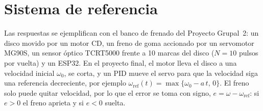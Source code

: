 \section*{Sistema de referencia}
Las respuestas se ejemplifican con el banco de frenado del Proyecto Grupal~2: un disco movido por
un motor CD, un freno de goma accionado por un servomotor MG90S, un sensor óptico TCRT5000 frente a
10 marcas del disco ($N=10$ pulsos por vuelta) y un ESP32. En el proyecto final, el motor lleva el
disco a una velocidad inicial $\omega_0$, se corta, y un PID mueve el servo para que la velocidad
siga una referencia decreciente, por ejemplo $\omega_\text{ref}(t)=\max\{\omega_0-a\,t,\,0\}$. El
freno solo puede quitar velocidad, por lo que el error se toma con signo, $e=\omega-\omega_\text{ref}$:
si $e>0$ el freno aprieta y si $e<0$ suelta.
